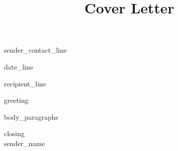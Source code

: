 \documentclass[11pt,a4paper,sans]{moderncv}
\title{Cover Letter}
\begin{document}
\makecvtitle

\begin{flushleft}
  {\small {{sender_contact_line}}}
\end{flushleft}

\vspace{4pt}

{{date_line}}

\vspace{6pt}

{{recipient_line}}

\vspace{6pt}

{{greeting}}

{{body_paragraphs}}

{{closing}}\\[24pt]
{{sender_name}}
\end{document}
